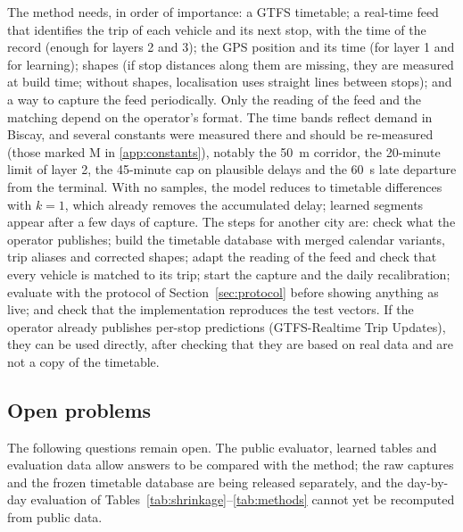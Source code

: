 The method needs, in order of importance: a GTFS timetable; a real-time feed that identifies the trip of each vehicle
and its next stop, with the time of the record (enough for layers 2 and 3); the GPS position and its time (for layer 1
and for learning); shapes (if stop distances along them are missing, they are measured at build time; without shapes, localisation
uses straight lines between stops); and a way to
capture the feed periodically. Only the reading of the feed and the matching depend on the operator's format. The time
bands reflect demand in Biscay, and several constants were measured there and should be re-measured (those marked M
in \ref{app:constants}), notably the 50~m corridor,
the 20-minute limit of layer 2, the 45-minute cap on plausible delays and the 60~s late departure from the terminal.
With no samples, the model reduces to timetable differences with $k=1$, which already removes the accumulated delay;
learned segments appear after a few days of capture. The steps for another city are: check what the operator
publishes; build the timetable database with merged calendar variants, trip aliases and corrected shapes; adapt the
reading of the feed and check that every vehicle is matched to its trip; start the capture and the daily
recalibration; evaluate with the protocol of Section~\ref{sec:protocol} before showing anything as live; and check
that the implementation reproduces the test vectors. If the operator already publishes per-stop predictions
(GTFS-Realtime Trip Updates), they can be used directly, after checking that they are based on real data and are not a
copy of the timetable.

\subsection{Open problems}
\label{sec:open}

The following questions remain open. The public evaluator, learned tables and evaluation data allow answers to be
compared with the method; the raw captures and the frozen timetable database are being released separately, and the
day-by-day evaluation of Tables~\ref{tab:shrinkage}--\ref{tab:methods} cannot yet be recomputed from public data.

